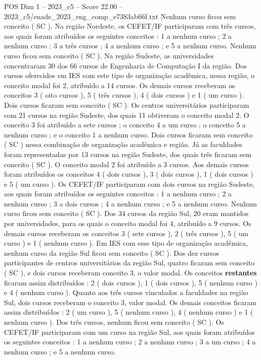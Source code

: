 \begin{textsample}{POS Dim 1 – 2023\_c5 – Score 22.00 – 2023\_c5/enade\_2023\_eng\_comp\_e7383ab66f.txt}
Nenhum curso ficou sem conceito ( SC ).
Na região Nordeste, os CEFET/IF participaram com três cursos, aos quais foram atribuídos os seguintes conceitos : 1 a nenhum curso ; 2 a nenhum curso ; 3 a três cursos ; 4 a nenhum curso ; e 5 a nenhum curso.
Nenhum curso ficou sem conceito ( SC ).
Na região Sudeste, as universidades concentraram 30 dos 66 cursos de Engenharia de Computação I da região.
Dos cursos oferecidos em IES com este tipo de organização acadêmica, nessa região, o conceito modal foi 2, atribuído a 14 cursos.
Os demais cursos receberam os conceitos 3 ( oito cursos ), 5 ( três cursos ), 4 ( dois cursos ) e 1 ( um curso ).
Dois cursos ficaram sem conceito ( SC ).
Os centros universitários participaram com 21 cursos na região Sudeste, dos quais 11 obtiveram o conceito modal 2.
O conceito 3 foi atribuído a sete cursos ; o conceito 4 a um curso ; o conceito 5 a nenhum curso ; e o conceito 1 a nenhum curso.
Dois cursos ficaram sem conceito ( SC ) nessa combinação de organização acadêmica e região.
Já as faculdades foram representadas por 13 cursos na região Sudeste, dos quais três ficaram sem conceito ( SC ).
O conceito modal 2 foi atribuído a 3 cursos.
Aos demais cursos foram atribuídos os conceitos 4 ( dois cursos ), 3 ( dois cursos ), 1 ( dois cursos ) e 5 ( um curso ).
Os CEFET/IF participaram com dois cursos na região Sudeste, aos quais foram atribuídos os seguintes conceitos : 1 a nenhum curso ; 2 a nenhum curso ; 3 a dois cursos ; 4 a nenhum curso ; e 5 a nenhum curso.
Nenhum curso ficou sem conceito ( SC ).
Dos 34 cursos da região Sul, 20 eram mantidos por universidades, para os quais o conceito modal foi 4, atribuído a 9 cursos.
Os demais cursos receberam os conceitos 3 ( sete cursos ), 2 ( três cursos ), 5 ( um curso ) e 1 ( nenhum curso ).
Em IES com esse tipo de organização acadêmica, nenhum curso da região Sul ficou sem conceito ( SC ).
Dos dez cursos participantes de centros universitários da região Sul, quatro ficaram sem conceito ( SC ), e dois cursos receberam conceito 3, o valor modal.
Os conceitos \textbf{restantes} ficaram assim distribuídos : 2 ( dois cursos ), 1 ( dois cursos ), 5 ( nenhum curso ) e 4 ( nenhum curso ).
Quanto aos três cursos vinculados a faculdades na região Sul, dois cursos receberam o conceito 3, valor modal.
Os demais conceitos ficaram assim distribuídos : 2 ( um curso ), 5 ( nenhum curso ), 4 ( nenhum curso ) e 1 ( nenhum curso ).
Dos três cursos, nenhum ficou sem conceito ( SC ).
Os CEFET/IF participaram com um curso na região Sul, aos quais foram atribuídos os seguintes conceitos : 1 a nenhum curso ; 2 a nenhum curso ; 3 a um curso ; 4 a nenhum curso ; e 5 a nenhum curso.

\end{textsample}
